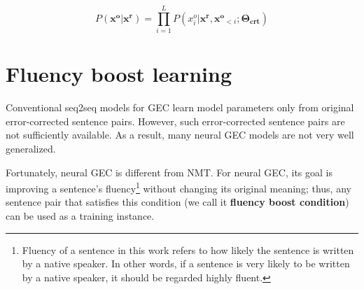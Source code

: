 \documentclass{article} %
\begin{document}
\begin{equation}
P(\boldsymbol{x^o}|\boldsymbol{x^r}) = \prod_{i=1}^{L}P(x^o_i|\boldsymbol{x^r},\boldsymbol{x^o}_{<i};\boldsymbol{\Theta_{crt}})
\end{equation}



\section{Fluency boost learning}\label{sec:learning}


Conventional seq2seq models for GEC learn model parameters only from original error-corrected sentence pairs.
However, such error-corrected sentence pairs are not sufficiently available. As a result, many neural GEC models are not very well generalized.%

Fortunately, neural GEC is different from NMT. For neural GEC, its goal is improving a sentence's fluency\footnote{Fluency of a sentence in this work refers to how likely the sentence is written by a native speaker. In other words, if a sentence is very likely to be written by a native speaker, it should be regarded highly fluent.} without changing its original meaning; thus, any sentence pair that satisfies this condition (we call it \textbf{fluency boost condition}) can be used as a training instance.

%
%
%
\end{document}
